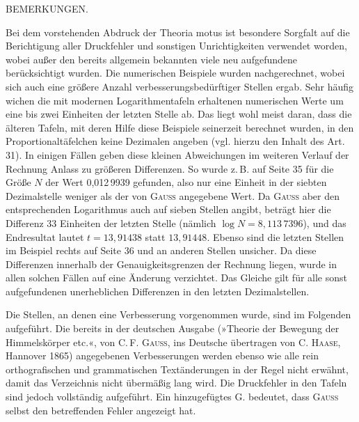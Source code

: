 \clearpage
{}
\begin{center}\large BEMERKUNGEN.\end{center}
Bei dem vorstehenden Abdruck der Theoria motus ist besondere Sorgfalt auf die Berichtigung
aller Druckfehler und sonstigen Unrichtigkeiten verwendet worden, wobei außer den bereits
allgemein bekannten viele neu aufgefundene berücksichtigt wurden. Die numerischen
Beispiele wurden nachgerechnet, wobei sich auch eine größere Anzahl verbesserungsbedürftiger
Stellen ergab. Sehr häufig wichen die mit modernen Logarithmentafeln erhaltenen numerischen
Werte um eine bis zwei Einheiten der letzten Stelle ab. Das liegt wohl meist daran, dass
die älteren Tafeln, mit deren Hilfe diese Beispiele seinerzeit berechnet wurden, in den
Proportionaltäfelchen keine Dezimalen angeben (vgl. hierzu den Inhalt des Art. 31). In
einigen Fällen geben diese kleinen Abweichungen im weiteren Verlauf der Rechnung Anlass
zu größeren Differenzen. So wurde z.\,B. auf Seite 35 für die Größe $N$ der Wert
0,012\,9939 gefunden, also nur eine Einheit in der siebten Dezimalstelle weniger als der
von \textsc{Gauss} angegebene Wert. Da \textsc{Gauss} aber den entsprechenden Logarithmus
auch auf sieben Stellen angibt, beträgt hier die Differenz 33 Einheiten der letzten
Stelle (nämlich $\log N = 8{,}113\,7396$), und das Endresultat lautet $t = 13{,}91438$
statt $13{,}91448$. Ebenso sind die letzten Stellen im Beispiel rechts auf Seite 36 und
an anderen Stellen unsicher. Da diese Differenzen innerhalb der Genauigkeitsgrenzen
der Rechnung liegen, wurde in allen solchen Fällen auf eine Änderung verzichtet. Das
Gleiche gilt für alle sonst aufgefundenen unerheblichen Differenzen in den letzten
Dezimalstellen.

Die Stellen, an denen eine Verbesserung vorgenommen wurde, sind im Folgenden aufgeführt.
Die bereits in der deutschen Ausgabe (»Theorie der Bewegung der Himmelskörper etc.«,
von C.\,F. \textsc{Gauss}, ins Deutsche übertragen von C. \textsc{Haase}, Hannover 1865)
angegebenen Verbesserungen werden ebenso wie alle rein orthografischen und grammatischen
Textänderungen in der Regel nicht erwähnt, damit das Verzeichnis nicht übermäßig lang
wird. Die Druckfehler in den Tafeln sind jedoch vollständig aufgeführt. Ein hinzugefügtes
G. bedeutet, dass \textsc{Gauss} selbst den betreffenden Fehler angezeigt hat.

